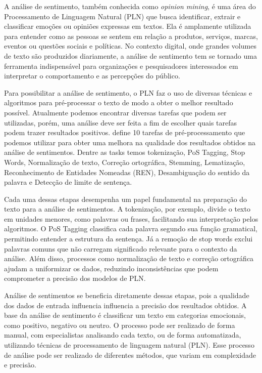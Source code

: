 \documentclass[
	12pt,				%
	oneside,			%
	a4paper,			%
	english,			%
	french,				%
	spanish,			%
	brazil				%
	]{abntex2}
\begin{document}
A análise de sentimento, também conhecida como \emph{opinion mining}, é
uma área do Processamento de Linguagem Natural (PLN) que busca
identificar, extrair e classificar emoções ou opiniões expressas em
textos. Ela é amplamente utilizada para entender como as pessoas se
sentem em relação a produtos, serviços, marcas, eventos ou questões
sociais e políticas. No contexto digital, onde grandes volumes de texto
são produzidos diariamente, a análise de sentimento tem se tornado uma
ferramenta indispensável para organizações e pesquisadores interessados
em interpretar o comportamento e as percepções do público.

Para possibilitar a análise de sentimento, o PLN faz o uso de diversas
técnicas e algoritmos para pré-processar o texto de modo a obter o
melhor resultado possível. Atualmente podemos encontrar diversas tarefas
que podem ser utilizadas, porém, uma análise deve ser feita a fim de
escolher quais tarefas podem trazer resultados positivos.
 define 10 tarefas de pré-processamento
que podemos utilizar para obter uma melhora na qualidade dos resultados
obtidos na análise de sentimentos. Dentre as tasks temos tokenização,
PoS Tagging, Stop Words, Normalização de texto, Correção ortográfica,
Stemming, Lematização, Reconhecimento de Entidades Nomeadas (REN),
Desambiguação do sentido da palavra e Detecção de limite de sentença.

Cada uma dessas etapas desempenha um papel fundamental na preparação do
texto para a análise de sentimentos. A tokenização, por exemplo, divide
o texto em unidades menores, como palavras ou frases, facilitando sua
interpretação pelos algoritmos. O PoS Tagging classifica cada palavra
segundo sua função gramatical, permitindo entender a estrutura da
sentença. Já a remoção de stop words exclui palavras comuns que não
carregam significado relevante para o contexto da análise. Além disso,
processos como normalização de texto e correção ortográfica ajudam a
uniformizar os dados, reduzindo inconsistências que podem comprometer a
precisão dos modelos de PLN.

Análise de sentimentos se beneficia diretamente dessas etapas, pois a
qualidade dos dados de entrada influencia influencia a precisão dos
resultados obtidos. A base da análise de sentimento é classificar um
texto em categorias emocionais, como positivo, negativo ou neutro. O
processo pode ser realizado de forma manual, com especialistas
analisando cada texto, ou de forma automatizada, utilizando técnicas de
processamento de linguagem natural (PLN). Esse processo de análise pode
ser realizado de diferentes métodos, que variam em complexidade e
precisão.
\end{document}
